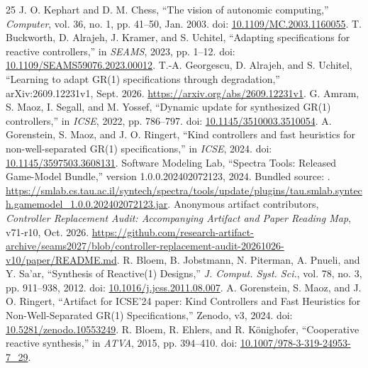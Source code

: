 \begin{thebibliography}{25}
J. O. Kephart and D. M. Chess, ``The vision of autonomic computing,'' \emph{Computer}, vol. 36, no. 1, pp. 41--50, Jan. 2003. doi: \href{https://doi.org/10.1109/MC.2003.1160055}{10.1109/MC.2003.1160055}.
T. Buckworth, D. Alrajeh, J. Kramer, and S. Uchitel, ``Adapting specifications for reactive controllers,'' in \emph{SEAMS}, 2023, pp. 1--12. doi: \href{https://doi.org/10.1109/SEAMS59076.2023.00012}{10.1109/SEAMS59076.2023.00012}.
T.-A. Georgescu, D. Alrajeh, and S. Uchitel, ``Learning to adapt GR(1) specifications through degradation,'' arXiv:2609.12231v1, Sept. 2026. \url{https://arxiv.org/abs/2609.12231v1}.
G. Amram, S. Maoz, I. Segall, and M. Yossef, ``Dynamic update for synthesized GR(1) controllers,'' in \emph{ICSE}, 2022, pp. 786--797. doi: \href{https://doi.org/10.1145/3510003.3510054}{10.1145/3510003.3510054}.
A. Gorenstein, S. Maoz, and J. O. Ringert, ``Kind controllers and fast heuristics for non-well-separated GR(1) specifications,'' in \emph{ICSE}, 2024. doi: \href{https://doi.org/10.1145/3597503.3608131}{10.1145/3597503.3608131}.
Software Modeling Lab, ``Spectra Tools: Released Game-Model Bundle,'' version 1.0.0.202402072123, 2024. Bundled source: . \url{https://smlab.cs.tau.ac.il/syntech/spectra/tools/update/plugins/tau.smlab.syntech.gamemodel_1.0.0.202402072123.jar}.
 Anonymous artifact contributors, \emph{Controller Replacement Audit: Accompanying Artifact and Paper Reading Map}, v71-r10, Oct. 2026. \url{https://github.com/research-artifact-archive/seams2027/blob/controller-replacement-audit-20261026-v10/paper/README.md}.
R. Bloem, B. Jobstmann, N. Piterman, A. Pnueli, and Y. Sa'ar, ``Synthesis of Reactive(1) Designs,'' \emph{J. Comput. Syst. Sci.}, vol. 78, no. 3, pp. 911--938, 2012. doi: \href{https://doi.org/10.1016/j.jcss.2011.08.007}{10.1016/j.jcss.2011.08.007}.
A. Gorenstein, S. Maoz, and J. O. Ringert, ``Artifact for ICSE'24 paper: Kind Controllers and Fast Heuristics for Non-Well-Separated GR(1) Specifications,'' Zenodo, v3, 2024. doi: \href{https://doi.org/10.5281/zenodo.10553249}{10.5281/zenodo.10553249}.
R. Bloem, R. Ehlers, and R. K\"onighofer, ``Cooperative reactive synthesis,'' in \emph{ATVA}, 2015, pp. 394--410. doi: \href{https://doi.org/10.1007/978-3-319-24953-7_29}{10.1007/978-3-319-24953-7\_29}.

\end{thebibliography}
